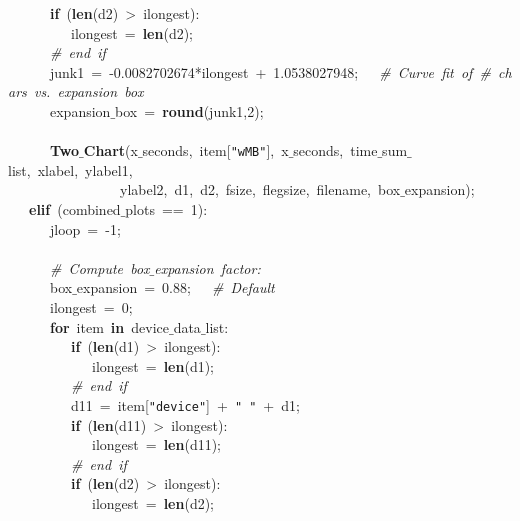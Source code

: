 \mbox{}\ \ \ \ \ \ \textbf{if}\ (\textbf{len}(d2)\ \textgreater{}\ ilongest): \\
\mbox{}\ \ \ \ \ \ \ \ \ ilongest\ =\ \textbf{len}(d2); \\
\mbox{}\ \ \ \ \ \ \textit{\#\ end\ if} \\
\mbox{}\ \ \ \ \ \ junk1\ =\ -0.0082702674*ilongest\ +\ 1.0538027948;\ \ \ \textit{\#\ Curve\ fit\ of\ \#\ chars\ vs.\ expansion\ box} \\
\mbox{}\ \ \ \ \ \ expansion$\_$box\ =\ \textbf{round}(junk1,2); \\
\mbox{}\ \ \ \ \ \  \\
\mbox{}\ \ \ \ \ \ \textbf{Two$\_$Chart}(x$\_$seconds,\ item[\texttt{"{}wMB"{}}],\ x$\_$seconds,\ time$\_$sum$\_$list,\ xlabel,\ ylabel1,\  \\
\mbox{}\ \ \ \ \ \ \ \ \ \ \ \ \ \ \ \ ylabel2,\ d1,\ d2,\ fsize,\ flegsize,\ filename,\ box$\_$expansion); \\
\mbox{}\ \ \ \textbf{elif}\ (combined$\_$plots\ ==\ 1): \\
\mbox{}\ \ \ \ \ \ jloop\ =\ -1; \\
\mbox{}\ \ \ \ \ \  \\
\mbox{}\ \ \ \ \ \ \textit{\#\ Compute\ box$\_$expansion\ factor:} \\
\mbox{}\ \ \ \ \ \ box$\_$expansion\ =\ 0.88;\ \ \ \textit{\#\ Default} \\
\mbox{}\ \ \ \ \ \ ilongest\ =\ 0; \\
\mbox{}\ \ \ \ \ \ \textbf{for}\ item\ \textbf{in}\ device$\_$data$\_$list: \\
\mbox{}\ \ \ \ \ \ \ \ \ \textbf{if}\ (\textbf{len}(d1)\ \textgreater{}\ ilongest): \\
\mbox{}\ \ \ \ \ \ \ \ \ \ \ \ ilongest\ =\ \textbf{len}(d1); \\
\mbox{}\ \ \ \ \ \ \ \ \ \textit{\#\ end\ if} \\
\mbox{}\ \ \ \ \ \ \ \ \ d11\ =\ item[\texttt{"{}device"{}}]\ +\ \texttt{"{}\ "{}}\ +\ d1; \\
\mbox{}\ \ \ \ \ \ \ \ \ \textbf{if}\ (\textbf{len}(d11)\ \textgreater{}\ ilongest): \\
\mbox{}\ \ \ \ \ \ \ \ \ \ \ \ ilongest\ =\ \textbf{len}(d11); \\
\mbox{}\ \ \ \ \ \ \ \ \ \textit{\#\ end\ if} \\
\mbox{}\ \ \ \ \ \ \ \ \ \textbf{if}\ (\textbf{len}(d2)\ \textgreater{}\ ilongest): \\
\mbox{}\ \ \ \ \ \ \ \ \ \ \ \ ilongest\ =\ \textbf{len}(d2); \\
